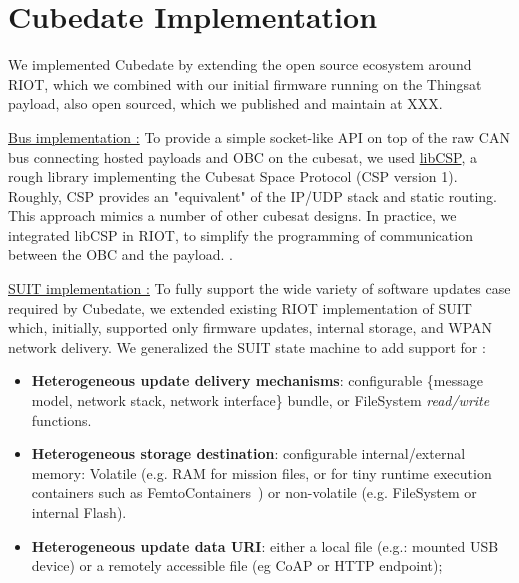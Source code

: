 \section{Cubedate Implementation}
\label{sec:implementation}

We implemented Cubedate by extending the open source ecosystem around RIOT, which we combined with our initial firmware running on the Thingsat payload, also open sourced, which we published and maintain at XXX. 


\underline{Bus implementation :}
To provide a simple socket-like API on top of the raw CAN bus connecting hosted payloads and OBC on the cubesat, we used \href{https://github.com/libcsp/libcsp}{libCSP}, a rough library implementing the Cubesat Space Protocol (CSP version 1). Roughly, CSP provides an "equivalent" of the IP/UDP stack and static routing. This approach mimics a number of other cubesat designs. In practice, we integrated libCSP in RIOT, to simplify the programming of communication between the OBC and the payload.%
.


\underline{SUIT implementation :}
To fully support the wide variety of software updates case required by Cubedate, we extended existing RIOT implementation of SUIT~\cite{zandberg2019secure} which, initially, supported only firmware updates, internal storage, and WPAN network delivery. We generalized the SUIT state machine to add support for :

\begin{itemize}
    \item \textbf{Heterogeneous update delivery mechanisms}: configurable \{message model, network stack, network interface\} bundle, or FileSystem \textit{read/write} functions.
    \item \textbf{Heterogeneous storage destination}: configurable internal/external memory: Volatile 
     (e.g. RAM for mission files, or for tiny runtime execution containers such as FemtoContainers~\cite{zandberg2021femto})
    or non-volatile (e.g. FileSystem or internal Flash).
     \item \textbf{Heterogeneous update data URI}: either a local file (e.g.: mounted USB device) or a remotely accessible file (eg CoAP or HTTP endpoint);
\end{itemize}

